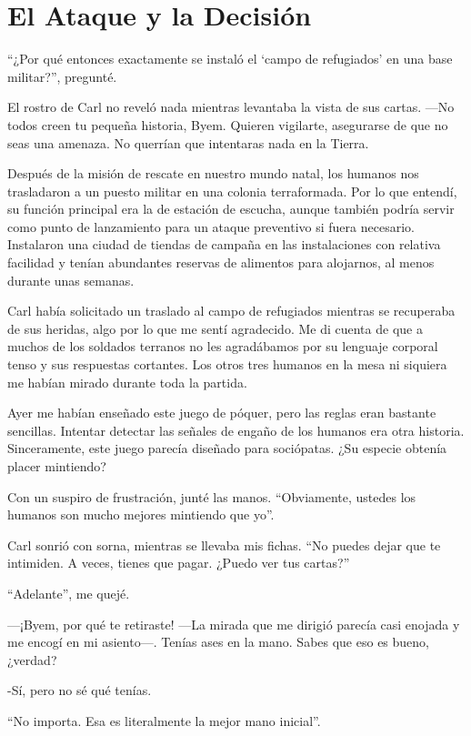 \chapter{El Ataque y la Decisión}\label{sec:el-ataque-y-la-decision}

``¿Por qué entonces exactamente se instaló el ‘campo de refugiados’ en una base militar?'', pregunté.

El rostro de Carl no reveló nada mientras levantaba la vista de sus cartas. —No todos creen tu pequeña historia, Byem. Quieren vigilarte, asegurarse de que no seas una amenaza. No querrían que intentaras nada en la Tierra.

Después de la misión de rescate en nuestro mundo natal, los humanos nos trasladaron a un puesto militar en una colonia terraformada. Por lo que entendí, su función principal era la de estación de escucha, aunque también podría servir como punto de lanzamiento para un ataque preventivo si fuera necesario. Instalaron una ciudad de tiendas de campaña en las instalaciones con relativa facilidad y tenían abundantes reservas de alimentos para alojarnos, al menos durante unas semanas.

Carl había solicitado un traslado al campo de refugiados mientras se recuperaba de sus heridas, algo por lo que me sentí agradecido. Me di cuenta de que a muchos de los soldados terranos no les agradábamos por su lenguaje corporal tenso y sus respuestas cortantes. Los otros tres humanos en la mesa ni siquiera me habían mirado durante toda la partida.

Ayer me habían enseñado este juego de póquer, pero las reglas eran bastante sencillas. Intentar detectar las señales de engaño de los humanos era otra historia. Sinceramente, este juego parecía diseñado para sociópatas. ¿Su especie obtenía placer mintiendo?

Con un suspiro de frustración, junté las manos. ``Obviamente, ustedes los humanos son mucho mejores mintiendo que yo''.

Carl sonrió con sorna, mientras se llevaba mis fichas. ``No puedes dejar que te intimiden. A veces, tienes que pagar. ¿Puedo ver tus cartas?''

``Adelante'', me quejé.

—¡Byem, por qué te retiraste! —La mirada que me dirigió parecía casi enojada y me encogí en mi asiento—. Tenías ases en la mano. Sabes que eso es bueno, ¿verdad?

-Sí, pero no sé qué tenías.

``No importa. Esa es literalmente la mejor mano inicial''.

